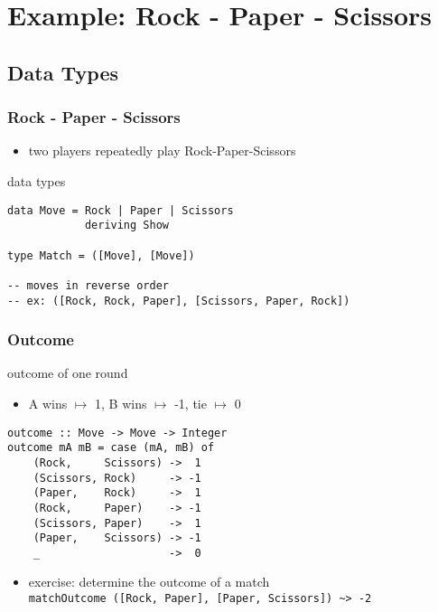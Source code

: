 \documentclass[dvipsnames]{beamer}
\theoremstyle{plain}
\begin{document}
\section{Example: Rock - Paper - Scissors}

\subsection{Data Types}

\begin{frame}[fragile]
  \frametitle{Rock - Paper - Scissors}

  \begin{itemize}
    \item two players repeatedly play Rock-Paper-Scissors
  \end{itemize}

  \begin{exampleblock}{data types}
    \begin{lstlisting}
data Move = Rock | Paper | Scissors
            deriving Show

type Match = ([Move], [Move])

-- moves in reverse order
-- ex: ([Rock, Rock, Paper], [Scissors, Paper, Rock])
    \end{lstlisting}
  \end{exampleblock}
\end{frame}

\begin{frame}[fragile]
  \frametitle{Outcome}

  \begin{exampleblock}{outcome of one round}
    \begin{itemize}
      \item A wins $\mapsto$ 1, B wins $\mapsto$ -1, tie $\mapsto$ 0
    \end{itemize}
    \begin{lstlisting}
outcome :: Move -> Move -> Integer
outcome mA mB = case (mA, mB) of
    (Rock,     Scissors) ->  1
    (Scissors, Rock)     -> -1
    (Paper,    Rock)     ->  1
    (Rock,     Paper)    -> -1
    (Scissors, Paper)    ->  1
    (Paper,    Scissors) -> -1
    _                    ->  0
    \end{lstlisting}
  \end{exampleblock}

  \pause
  \vspace{-12pt}
  \begin{itemize}
    \item exercise: determine the outcome of a match\\
      \lstinline|matchOutcome ([Rock, Paper], [Paper, Scissors]) ~> -2|
  \end{itemize}
\end{frame}
\end{document}

